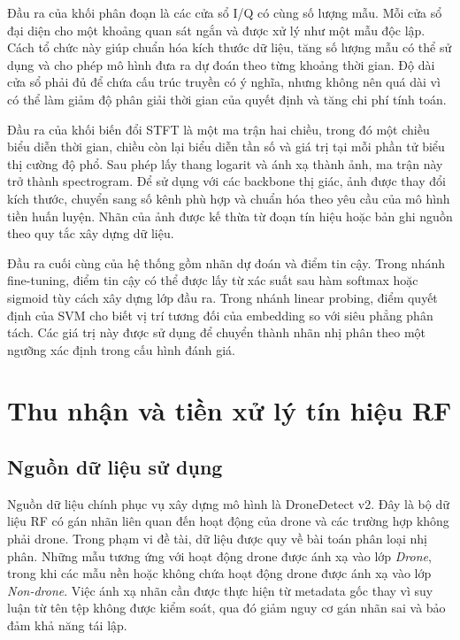 \documentclass[../DoAn.tex]{subfiles}
\begin{document}
Đầu ra của khối phân đoạn là các cửa sổ I/Q có cùng số lượng mẫu. Mỗi cửa sổ đại diện cho một khoảng quan sát ngắn và được xử lý như một mẫu độc lập. Cách tổ chức này giúp chuẩn hóa kích thước dữ liệu, tăng số lượng mẫu có thể sử dụng và cho phép mô hình đưa ra dự đoán theo từng khoảng thời gian. Độ dài cửa sổ phải đủ để chứa cấu trúc truyền có ý nghĩa, nhưng không nên quá dài vì có thể làm giảm độ phân giải thời gian của quyết định và tăng chi phí tính toán.

Đầu ra của khối biến đổi STFT là một ma trận hai chiều, trong đó một chiều biểu diễn thời gian, chiều còn lại biểu diễn tần số và giá trị tại mỗi phần tử biểu thị cường độ phổ. Sau phép lấy thang logarit và ánh xạ thành ảnh, ma trận này trở thành spectrogram. Để sử dụng với các backbone thị giác, ảnh được thay đổi kích thước, chuyển sang số kênh phù hợp và chuẩn hóa theo yêu cầu của mô hình tiền huấn luyện. Nhãn của ảnh được kế thừa từ đoạn tín hiệu hoặc bản ghi nguồn theo quy tắc xây dựng dữ liệu.

Đầu ra cuối cùng của hệ thống gồm nhãn dự đoán và điểm tin cậy. Trong nhánh fine-tuning, điểm tin cậy có thể được lấy từ xác suất sau hàm softmax hoặc sigmoid tùy cách xây dựng lớp đầu ra. Trong nhánh linear probing, điểm quyết định của SVM cho biết vị trí tương đối của embedding so với siêu phẳng phân tách. Các giá trị này được sử dụng để chuyển thành nhãn nhị phân theo một ngưỡng xác định trong cấu hình đánh giá.

\section{Thu nhận và tiền xử lý tín hiệu RF}

\subsection{Nguồn dữ liệu sử dụng}

Nguồn dữ liệu chính phục vụ xây dựng mô hình là DroneDetect v2. Đây là bộ dữ liệu RF có gán nhãn liên quan đến hoạt động của drone và các trường hợp không phải drone. Trong phạm vi đề tài, dữ liệu được quy về bài toán phân loại nhị phân. Những mẫu tương ứng với hoạt động drone được ánh xạ vào lớp \textit{Drone}, trong khi các mẫu nền hoặc không chứa hoạt động drone được ánh xạ vào lớp \textit{Non-drone}. Việc ánh xạ nhãn cần được thực hiện từ metadata gốc thay vì suy luận từ tên tệp không được kiểm soát, qua đó giảm nguy cơ gán nhãn sai và bảo đảm khả năng tái lập.
\end{document}
